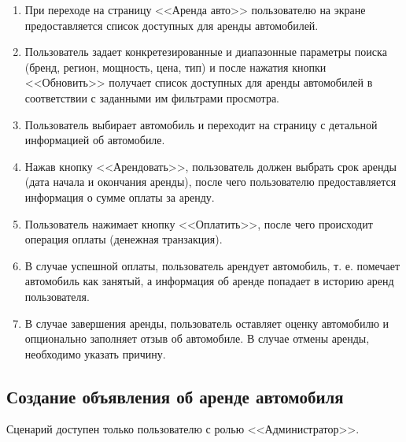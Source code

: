 \begin{enumerate}
	\item При переходе на страницу <<Аренда авто>> пользователю на экране предоставляется список доступных для аренды автомобилей.
	
	\item Пользователь задает конкретезированные и диапазонные параметры поиска (бренд, регион, мощность, цена, тип) и после нажатия кнопки <<Обновить>> получает список доступных для аренды автомобилей в соответствии с заданными им фильтрами просмотра.
	
	\item Пользователь выбирает автомобиль и переходит на страницу с детальной информацией об автомобиле.
	
	\item Нажав кнопку <<Арендовать>>, пользователь должен выбрать срок аренды (дата начала и окончания аренды), после чего пользователю предоставляется информация о сумме оплаты за аренду.
	
	\item Пользователь нажимает кнопку <<Оплатить>>, после чего происходит операция оплаты (денежная транзакция).
	
	\item В случае успешной оплаты, пользователь арендует автомобиль, т. е. помечает автомобиль как занятый, а информация об аренде попадает в историю аренд пользователя.
	
	\item В случае завершения аренды, пользователь оставляет оценку автомобилю и опционально заполняет отзыв об автомобиле. В случае отмены аренды, необходимо указать причину.
\end{enumerate}

\subsection*{Создание объявления об аренде автомобиля}

Сценарий доступен только пользователю с ролью <<Администратор>>.

